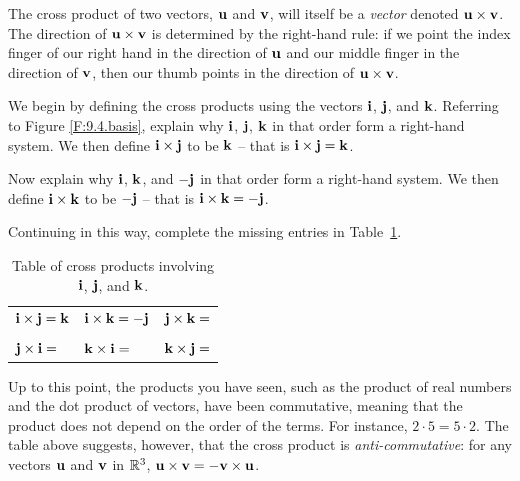 \begin{pa} \label{PA:9.4} 

  The cross product of two vectors, $\mathbf{u}$ and $\mathbf{v}$, will itself be a
  {\em vector} denoted $\mathbf{u}\times\mathbf{v}$.  The direction of
  $\mathbf{u}\times\mathbf{v}$ is determined by the right-hand rule: if we point the
  index finger of our right hand in the direction of $\mathbf{u}$ and our
  middle finger in the direction of $\mathbf{v}$, then our thumb points in
  the direction of $\mathbf{u}\times\mathbf{v}$.

  \ba

  \item We begin by defining the cross products using the vectors $\mathbf{i}$,
  $\mathbf{j}$, and $\mathbf{k}$.  Referring to Figure \ref{F:9.4.basis}, explain
  why $\mathbf{i}$, $\mathbf{j}$, $\mathbf{k}$ in that order form a right-hand system. We then define $\mathbf{i} \times \mathbf{j}$ to be $\mathbf{k}$ -- that is $\mathbf{i}\times\mathbf{j} = \mathbf{k}$.  
  \item Now explain why $\mathbf{i}$, $\mathbf{k}$, and $-\mathbf{j}$ in that order form a right-hand system. We then define $\mathbf{i} \times \mathbf{k}$ to be $-\mathbf{j}$ -- that is  $\mathbf{i}\times\mathbf{k}=-\mathbf{j}$.
  \item Continuing in this way, complete the missing entries in Table~\ref{T:9.4.cross.def}.
    \begin{table}[ht]
      \begin{center}
        \begin{tabular}{lll}
          $\mathbf{i}\times\mathbf{j} = \mathbf{k}$ \hspace*{1in} &
          $\mathbf{i}\times\mathbf{k} = -\mathbf{j}$ \hspace*{1in} &
          $\mathbf{j}\times\mathbf{k} = $\hspace*{1in} \\ \\
          $\mathbf{j}\times\mathbf{i} = $ &
          $\mathbf{k}\times\mathbf{i} = $ &
          $\mathbf{k}\times\mathbf{j} = $
        \end{tabular}
      \end{center}
      \caption{Table of cross products involving $\mathbf{i}$, $\mathbf{j}$, and $\mathbf{k}$.} 
      \label{T:9.4.cross.def}
    \end{table}

  \item Up to this point, the products you have seen, such as the
    product of real numbers and the dot product of vectors, have been
    commutative, meaning that the product does not depend on the order
    of the terms.  For instance, $2\cdot5 = 5\cdot 2$.  The table
    above suggests, however, that the cross
    product is {\em anti-commutative}: for any vectors $\mathbf{u}$ and $\mathbf{v}$ in $\mathbb{R}^3$,  $\mathbf{u}\times\mathbf{v} =
    -\mathbf{v}\times\mathbf{u}$.  


\end{pa}
